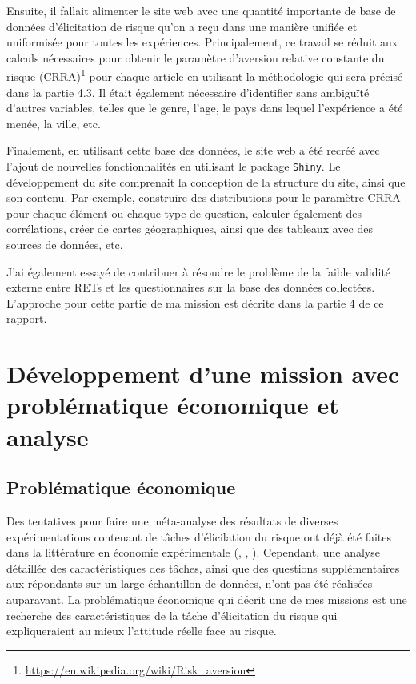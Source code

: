 \documentclass[12pt]{article}
\begin{document}
Ensuite, il fallait alimenter le site web avec une quantité importante
de base de données d'élicitation de risque qu'on a reçu dans une manière
unifiée et uniformisée pour toutes les expériences. Principalement, ce
travail se réduit aux calculs nécessaires pour obtenir le paramètre
d'aversion relative constante du risque (CRRA)\footnote{\url{https://en.wikipedia.org/wiki/Risk_aversion}}
pour chaque article en utilisant la méthodologie qui sera précisé dans
la partie 4.3. Il était également nécessaire d'identifier sans ambiguïté
d'autres variables, telles que le genre, l'age, le pays dans lequel
l'expérience a été menée, la ville, etc.

Finalement, en utilisant cette base des données, le site web a été
recréé avec l'ajout de nouvelles fonctionnalités en utilisant le package
\texttt{Shiny}. Le développement du site comprenait la conception de la
structure du site, ainsi que son contenu. Par exemple, construire des
distributions pour le paramètre CRRA pour chaque élément ou chaque type
de question, calculer également des corrélations, créer de cartes
géographiques, ainsi que des tableaux avec des sources de données, etc.

J'ai également essayé de contribuer à résoudre le problème de la faible
validité externe entre RETs et les questionnaires sur la base des
données collectées. L'approche pour cette partie de ma mission est
décrite dans la partie 4 de ce rapport.

\section{Développement d’une mission avec problématique économique et analyse}
\label{sec:fourth}

\subsection{Problématique économique}

Des tentatives pour faire une méta-analyse des résultats de diverses
expérimentations contenant de tâches d'élicilation du risque ont déjà
été faites dans la littérature en économie expérimentale
(\citet{CroFil2013b}, \citet{Alserda2019}, \citet{Bokern2021}).
Cependant, une analyse détaillée des caractéristiques des tâches, ainsi
que des questions supplémentaires aux répondants sur un large
échantillon de données, n'ont pas été réalisées auparavant. La
problématique économique qui décrit une de mes missions est une
recherche des caractéristiques de la tâche d'élicitation du risque qui
expliqueraient au mieux l'attitude réelle face au risque.
\end{document}
